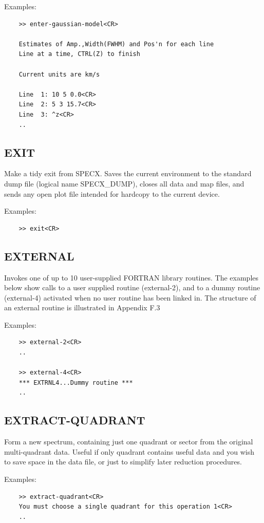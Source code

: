\documentclass[11pt,twoside]{report}
\begin{document}
Examples:
\begin{verbatim}
    >> enter-gaussian-model<CR>

    Estimates of Amp.,Width(FWHM) and Pos'n for each line
    Line at a time, CTRL(Z) to finish

    Current units are km/s

    Line  1: 10 5 0.0<CR>
    Line  2: 5 3 15.7<CR>
    Line  3: ^z<CR>
    ..
\end{verbatim}

\subsection{EXIT} 

Make a tidy exit from SPECX. Saves the current environment to the standard
dump file (logical name SPECX\_DUMP), closes all data and map files, and sends
any open plot file intended for hardcopy to the current device.

Examples:
\begin{verbatim}
    >> exit<CR>
\end{verbatim}

\subsection{EXTERNAL} 

Invokes one of up to 10 user-supplied FORTRAN library routines. The
examples below show calls to a user supplied routine (external-2), and to a
dummy routine (external-4) activated when no user routine has been linked
in. The structure of an external routine is illustrated in Appendix F.3

Examples:
\begin{verbatim}
    >> external-2<CR>
    ..

    >> external-4<CR>
    *** EXTRNL4...Dummy routine ***
    ..
\end{verbatim}

\subsection{EXTRACT-QUADRANT} 

Form a new spectrum, containing just one quadrant or sector from the
original multi-quadrant data. Useful if only quadrant contains useful data
and you wish to save space in the data file, or just to simplify later
reduction procedures.

Examples:
\begin{verbatim}
    >> extract-quadrant<CR>
    You must choose a single quadrant for this operation 1<CR>
    ..
\end{verbatim}
\end{document}
